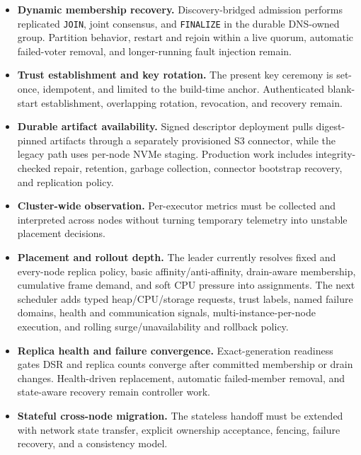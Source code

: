 \begin{itemize}
    \item \textbf{Dynamic membership recovery.} Discovery-bridged admission
        performs replicated \texttt{JOIN}, joint consensus, and
        \texttt{FINALIZE} in the durable DNS-owned group. Partition behavior,
        restart and rejoin within a live quorum, automatic failed-voter
        removal, and longer-running fault injection remain.

    \item \textbf{Trust establishment and key rotation.} The present key
        ceremony is set-once, idempotent, and limited to the build-time
        anchor. Authenticated blank-start establishment, overlapping
        rotation, revocation, and recovery remain.

    \item \textbf{Durable artifact availability.} Signed descriptor deployment
        pulls digest-pinned artifacts through a separately provisioned S3
        connector, while the legacy path uses per-node NVMe staging. Production work
        includes integrity-checked repair, retention, garbage collection,
        connector bootstrap recovery, and replication policy.

    \item \textbf{Cluster-wide observation.} Per-executor metrics must be
        collected and interpreted across nodes without turning temporary
        telemetry into unstable placement decisions.

    \item \textbf{Placement and rollout depth.} The leader currently resolves
        fixed and every-node replica policy, basic affinity/anti-affinity,
        drain-aware membership, cumulative frame demand, and soft CPU pressure
        into assignments. The next scheduler adds typed heap/CPU/storage
        requests, trust labels, named failure domains, health and communication
        signals, multi-instance-per-node execution, and rolling
        surge/unavailability and rollback policy.

    \item \textbf{Replica health and failure convergence.} Exact-generation
        readiness gates DSR and replica counts converge after committed
        membership or drain changes. Health-driven replacement, automatic
        failed-member removal, and state-aware recovery remain controller work.

    \item \textbf{Stateful cross-node migration.} The stateless handoff must
        be extended with network state transfer, explicit ownership
        acceptance, fencing, failure recovery, and a consistency model.


\end{itemize}
